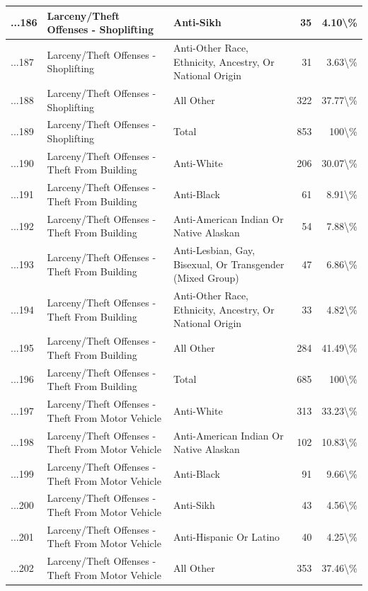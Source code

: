 \documentclass[
]{krantz}
\begin{document}
\begin{longtable}[t]{l|l|l|r|r}
\hline
...186 & Larceny/Theft Offenses - Shoplifting & Anti-Sikh & 35 & 4.10\textbackslash{}\%\\
\hline
...187 & Larceny/Theft Offenses - Shoplifting & Anti-Other Race, Ethnicity, Ancestry, Or National Origin & 31 & 3.63\textbackslash{}\%\\
\hline
...188 & Larceny/Theft Offenses - Shoplifting & All Other & 322 & 37.77\textbackslash{}\%\\
\hline
...189 & Larceny/Theft Offenses - Shoplifting & Total & 853 & 100\textbackslash{}\%\\
\hline
...190 & Larceny/Theft Offenses - Theft From Building & Anti-White & 206 & 30.07\textbackslash{}\%\\
\hline
...191 & Larceny/Theft Offenses - Theft From Building & Anti-Black & 61 & 8.91\textbackslash{}\%\\
\hline
...192 & Larceny/Theft Offenses - Theft From Building & Anti-American Indian Or Native Alaskan & 54 & 7.88\textbackslash{}\%\\
\hline
...193 & Larceny/Theft Offenses - Theft From Building & Anti-Lesbian, Gay, Bisexual, Or Transgender (Mixed Group) & 47 & 6.86\textbackslash{}\%\\
\hline
...194 & Larceny/Theft Offenses - Theft From Building & Anti-Other Race, Ethnicity, Ancestry, Or National Origin & 33 & 4.82\textbackslash{}\%\\
\hline
...195 & Larceny/Theft Offenses - Theft From Building & All Other & 284 & 41.49\textbackslash{}\%\\
\hline
...196 & Larceny/Theft Offenses - Theft From Building & Total & 685 & 100\textbackslash{}\%\\
\hline
...197 & Larceny/Theft Offenses - Theft From Motor Vehicle & Anti-White & 313 & 33.23\textbackslash{}\%\\
\hline
...198 & Larceny/Theft Offenses - Theft From Motor Vehicle & Anti-American Indian Or Native Alaskan & 102 & 10.83\textbackslash{}\%\\
\hline
...199 & Larceny/Theft Offenses - Theft From Motor Vehicle & Anti-Black & 91 & 9.66\textbackslash{}\%\\
\hline
...200 & Larceny/Theft Offenses - Theft From Motor Vehicle & Anti-Sikh & 43 & 4.56\textbackslash{}\%\\
\hline
...201 & Larceny/Theft Offenses - Theft From Motor Vehicle & Anti-Hispanic Or Latino & 40 & 4.25\textbackslash{}\%\\
\hline
...202 & Larceny/Theft Offenses - Theft From Motor Vehicle & All Other & 353 & 37.46\textbackslash{}\%\\

\end{longtable}
\end{document}
